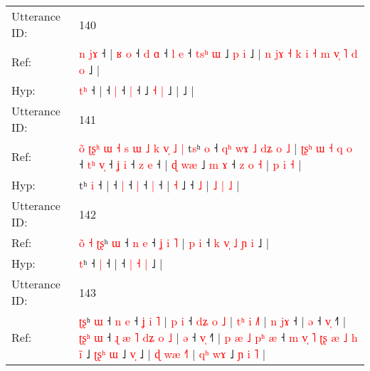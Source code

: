 \documentclass[10pt]{article}
\DeclareRobustCommand{\hl}[1]{{\textcolor{red}{#1}}}
\begin{document}
\begin{longtable}{ll}
 \\
\midrule
Utterance ID: & 140 \\
Ref: & \hl{n}\hl{ }\hl{j}\hl{ɤ} ˧ |\hl{ }\hl{ʁ}\hl{ }\hl{o} ˧\hl{ }\hl{d} \hl{ɑ} ˧\hl{ }\hl{l} \hl{e} ˧\hl{ }\hl{t}\hl{s}\hl{ʰ}\hl{ }\hl{ɯ} ˩ \hl{p} \hl{i} ˩ |\hl{ }\hl{n}\hl{ }\hl{j}\hl{ɤ}\hl{ }\hl{˧}\hl{ }\hl{k}\hl{ }\hl{i}\hl{ }\hl{˧}\hl{ }\hl{m}\hl{ }\hl{v}\hl{̩}\hl{ }\hl{˥}\hl{ }\hl{d}\hl{ }\hl{o} ˩ |
 \\
Hyp: & \hl{}\hl{}\hl{t}\hl{ʰ} ˧ |\hl{}\hl{}\hl{}\hl{} ˧\hl{}\hl{} \hl{|} ˧\hl{}\hl{} \hl{|} ˧\hl{}\hl{}\hl{}\hl{}\hl{}\hl{} ˩ \hl{˧} \hl{|} ˩ |\hl{}\hl{}\hl{}\hl{}\hl{}\hl{}\hl{}\hl{}\hl{}\hl{}\hl{}\hl{}\hl{}\hl{}\hl{}\hl{}\hl{}\hl{}\hl{}\hl{}\hl{}\hl{}\hl{}\hl{} ˩ |
 \\
\midrule
Utterance ID: & 141 \\
Ref: & \hl{o}\hl{̃}\hl{ }\hl{ʈ}\hl{ʂ}\hl{ʰ}\hl{ }\hl{ɯ}\hl{ }\hl{˧}\hl{ }\hl{s}\hl{ }\hl{ɯ}\hl{ }\hl{˩}\hl{ }\hl{k}\hl{ }\hl{v}\hl{̩}\hl{ }\hl{˩}\hl{ }\hl{|}\hl{ }t\hl{s}ʰ \hl{o} ˧\hl{ }\hl{q}\hl{ʰ}\hl{ }\hl{w}\hl{ɤ}\hl{ }\hl{˩}\hl{ }\hl{d}\hl{ʑ}\hl{ }\hl{o}\hl{ }\hl{˩} |\hl{ }\hl{ʈ}\hl{ʂ}\hl{ʰ}\hl{ }\hl{ɯ}\hl{ }\hl{˧}\hl{ }\hl{q}\hl{ }\hl{o} ˧\hl{ }\hl{t}\hl{ʰ} \hl{v}\hl{̩} ˧\hl{ }\hl{ʝ} \hl{i} ˧\hl{ }\hl{z} \hl{e} ˧ |\hl{ }\hl{ɖ} \hl{w}\hl{æ} ˩\hl{ }\hl{m}\hl{ }\hl{ɤ} ˧\hl{ }\hl{z}\hl{ }\hl{o} \hl{˧} | \hl{p} \hl{i} \hl{˧} |
 \\
Hyp: & \hl{}\hl{}\hl{}\hl{}\hl{}\hl{}\hl{}\hl{}\hl{}\hl{}\hl{}\hl{}\hl{}\hl{}\hl{}\hl{}\hl{}\hl{}\hl{}\hl{}\hl{}\hl{}\hl{}\hl{}\hl{}\hl{}t\hl{}ʰ \hl{i} ˧\hl{}\hl{}\hl{}\hl{}\hl{}\hl{}\hl{}\hl{}\hl{}\hl{}\hl{}\hl{}\hl{}\hl{}\hl{} |\hl{}\hl{}\hl{}\hl{}\hl{}\hl{}\hl{}\hl{}\hl{}\hl{}\hl{}\hl{} ˧\hl{}\hl{}\hl{} \hl{}\hl{|} ˧\hl{}\hl{} \hl{|} ˧\hl{}\hl{} \hl{|} ˧ |\hl{}\hl{} \hl{}\hl{˧} ˩\hl{}\hl{}\hl{}\hl{} ˧\hl{}\hl{}\hl{}\hl{} \hl{˩} | \hl{˩} \hl{|} \hl{˩} |
 \\
\midrule
Utterance ID: & 142 \\
Ref: & \hl{o}\hl{̃}\hl{ }\hl{˧}\hl{ }\hl{ʈ}\hl{ʂ}ʰ\hl{ }\hl{ɯ} ˧\hl{ }\hl{n} \hl{e} ˧\hl{ }\hl{ʝ}\hl{ }\hl{i}\hl{ }\hl{˥} |\hl{ }\hl{p}\hl{ }\hl{i} ˧\hl{ }\hl{k}\hl{ }\hl{v}\hl{̩} \hl{˩} \hl{ɲ} \hl{i} ˩ |
 \\
Hyp: & \hl{}\hl{}\hl{}\hl{}\hl{}\hl{}\hl{t}ʰ\hl{}\hl{} ˧\hl{}\hl{} \hl{|} ˧\hl{}\hl{}\hl{}\hl{}\hl{}\hl{} |\hl{}\hl{}\hl{}\hl{} ˧\hl{}\hl{}\hl{}\hl{}\hl{} \hl{|} \hl{˧} \hl{|} ˩ |
 \\
\midrule
Utterance ID: & 143 \\
Ref: & \hl{ʈ}\hl{ʂ}ʰ \hl{ɯ} ˧\hl{ }\hl{n} \hl{e} ˧\hl{ }\hl{ʝ}\hl{ }\hl{i}\hl{ }\hl{˥} |\hl{ }\hl{p}\hl{ }\hl{i} ˧\hl{ }\hl{d}\hl{ʑ}\hl{ }\hl{o}\hl{ }\hl{˩} |\hl{ }\hl{t}\hl{ʰ}\hl{ }\hl{i} \hl{˩}\hl{˥} |\hl{ }\hl{n}\hl{ }\hl{j}\hl{ɤ} ˧ |\hl{ }\hl{ə} ˧ \hl{v}\hl{̩} ˧\hl{˥} |\hl{ }\hl{ʈ}\hl{ʂ}\hl{ʰ}\hl{ }\hl{ɯ} ˧\hl{ }\hl{ɻ}\hl{ }\hl{æ}\hl{ }\hl{˥}\hl{ }\hl{d}\hl{ʑ}\hl{ }\hl{o}\hl{ }\hl{˩} |\hl{ }\hl{ə} ˧ \hl{v}\hl{̩} ˧\hl{˥} |\hl{ }\hl{p}\hl{ }\hl{æ}\hl{ }\hl{˩}\hl{ }\hl{p}\hl{ʰ}\hl{ }\hl{æ} ˧\hl{ }\hl{m}\hl{ }\hl{v}\hl{̩}\hl{ }\hl{˥}\hl{ }\hl{ʈ}\hl{ʂ} \hl{æ} \hl{˩} \hl{h} \hl{i}\hl{̃} ˩\hl{ }\hl{ʈ}\hl{ʂ}\hl{ʰ} \hl{ɯ} ˩ \hl{v}\hl{̩} ˩ |\hl{ }\hl{ɖ}\hl{ }\hl{w}\hl{æ} \hl{˧}\hl{˥} |\hl{ }\hl{q}\hl{ʰ}\hl{ }\hl{w}\hl{ɤ} ˩\hl{ }\hl{ɲ}\hl{ }\hl{i}\hl{ }\hl{˥} |

\end{longtable}
\end{document}
